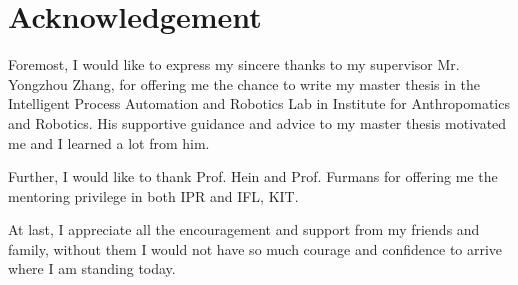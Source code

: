 \section*{Acknowledgement}
Foremost, I would like to express my sincere thanks to my supervisor Mr. Yongzhou Zhang, for offering me the chance to write my master thesis in the Intelligent Process Automation and Robotics Lab in Institute for Anthropomatics and Robotics. His supportive guidance and advice to my master thesis motivated me and I learned a lot from him. 

Further, I would like to thank Prof. Hein and Prof. Furmans for offering me the mentoring privilege in both IPR and  IFL, KIT. 

At last, I appreciate all the encouragement and support from my friends and family, without them I would not have so much courage and confidence to arrive where I am standing today.

